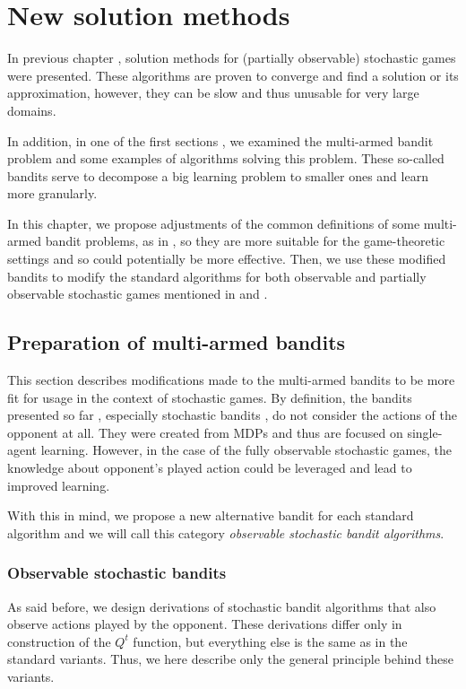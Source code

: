 \documentclass[../main.tex]{subfiles}
\begin{document}
\chapter{New solution methods}\label{new}
In previous chapter , solution methods for (partially observable) stochastic games were presented.
These algorithms are proven to converge and find a solution or its approximation, however, they can be slow and thus unusable for very large domains.

In addition, in one of the first sections , we examined the multi-armed bandit problem and some examples of algorithms solving this problem.
These so-called bandits serve to decompose a big learning problem to smaller ones and learn more granularly.

In this chapter, we propose adjustments of the common definitions of some multi-armed bandit problems, as in \cite{bandits}, so they are more suitable for the game-theoretic settings and so could potentially be more effective.
Then, we use these modified bandits to modify the standard algorithms for both observable and partially observable stochastic games mentioned in  and .

\section{Preparation of multi-armed bandits}\label{new:bandit}
This section describes modifications made to the multi-armed bandits to be more fit for usage in the context of stochastic games.
By definition, the bandits presented so far , especially stochastic bandits , do not consider the actions of the opponent at all.
They were created from MDPs and thus are focused on single-agent learning.
However, in the case of the fully observable stochastic games, the knowledge about opponent's played action could be leveraged and lead to improved learning.

With this in mind, we propose a new alternative bandit for each standard algorithm and we will call this category \textit{observable stochastic bandit algorithms}.

\subsection{Observable stochastic bandits}\label{new:bandit:obs}
As said before, we design derivations of stochastic bandit algorithms that also observe actions played by the opponent.
These derivations differ only in construction of the $Q^t$ function, but everything else is the same as in the standard variants.
Thus, we here describe only the general principle behind these variants.
\end{document}
